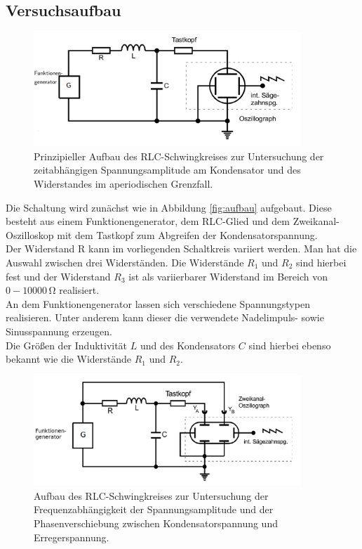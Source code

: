 \subsection{Versuchsaufbau}
\label{sec:Versuchsaufbau}
\begin{figure}
  \centering
  \includegraphics[width=0.9\textwidth]{Bilder/aufbaau.png}
  \caption{Prinzipieller Aufbau des RLC-Schwingkreises zur Untersuchung der zeitabhängigen Spannungsamplitude am Kondensator und des Widerstandes im aperiodischen Grenzfall.}
  \label{fig:aufbau}
\end{figure}
Die Schaltung wird zunächst wie in Abbildung \eqref{fig:aufbau} aufgebaut. Diese besteht aus einem Funktionengenerator, dem RLC-Glied und dem Zweikanal-Oszilloskop mit dem Tastkopf zum Abgreifen der Kondensatorspannung.\\
Der Widerstand R kann im vorliegenden Schaltkreis variiert werden. Man hat die Auswahl zwischen drei Widerständen. Die Widerstände $R_\text{1}$ und $R_\text{2}$ sind hierbei fest und der Widerstand $R_\text{3}$ ist als variierbarer Widerstand im Bereich von $0-10000\,\si{\ohm}$ realisiert.\\
An dem Funktionengenerator lassen sich verschiedene Spannungstypen realisieren. Unter anderem kann dieser die verwendete Nadelimpuls- sowie Sinusspannung erzeugen.\\
Die Größen der Induktivität $L$ und des Kondensators $C$ sind hierbei ebenso bekannt wie die Widerstände $R_\text{1}$ und $R_\text{2}$.

\begin{figure}
  \centering
  \includegraphics[width=0.9\textwidth]{Bilder/aufbauu.png}
  \caption{Aufbau des RLC-Schwingkreises zur Untersuchung der Frequenzabhängigkeit der Spannungsamplitude und der Phasenverschiebung zwischen Kondensatorspannung und Erregerspannung.}
  \label{fig:aufbau2}
\end{figure}


